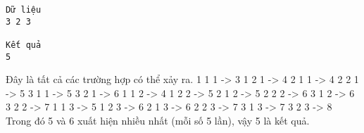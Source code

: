 \begin{verbatim}
Dữ liệu
3 2 3

Kết quả
5
\end{verbatim}
Đây là tất cả các trường hợp có thể xảy ra. 1 1 1 -> 3  1 2 1 -> 4  2 1 1 -> 4  2 2 1 -> 5  3 1 1 -> 5  3 2 1 -> 6 1 1 2 -> 4  1 2 2 -> 5  2 1 2 -> 5  2 2 2 -> 6  3 1 2 -> 6  3 2 2 -> 7 1 1 3 -> 5  1 2 3 -> 6  2 1 3 -> 6  2 2 3 -> 7  3 1 3 -> 7  3 2 3 -> 8 Trong đó 5 và 6 xuất hiện nhiều nhất (mỗi số 5 lần), vậy 5 là kết quả.